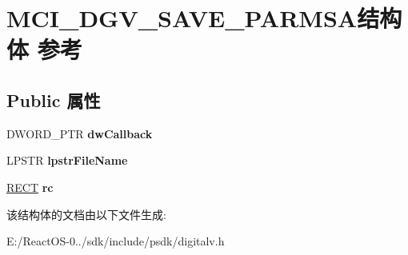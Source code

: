 \hypertarget{struct_m_c_i___d_g_v___s_a_v_e___p_a_r_m_s_a}{}\section{M\+C\+I\+\_\+\+D\+G\+V\+\_\+\+S\+A\+V\+E\+\_\+\+P\+A\+R\+M\+S\+A结构体 参考}
\label{struct_m_c_i___d_g_v___s_a_v_e___p_a_r_m_s_a}
\subsection*{Public 属性}
\begin{DoxyCompactItemize}
\item 
\mbox{\label{struct_m_c_i___d_g_v___s_a_v_e___p_a_r_m_s_a_a1239c6dc4ddb2b92169b8491aa6e3316}} 
D\+W\+O\+R\+D\+\_\+\+P\+TR {\bfseries dw\+Callback}
\item 
\mbox{\label{struct_m_c_i___d_g_v___s_a_v_e___p_a_r_m_s_a_aee8888ee60bd98b6b20227a8d70f121c}} 
L\+P\+S\+TR {\bfseries lpstr\+File\+Name}
\item 
\mbox{\label{struct_m_c_i___d_g_v___s_a_v_e___p_a_r_m_s_a_af09d3f6a29f52b8968e49808c72f934b}} 
\hyperlink{structtag_r_e_c_t}{R\+E\+CT} {\bfseries rc}
\end{DoxyCompactItemize}


该结构体的文档由以下文件生成\+:\begin{DoxyCompactItemize}
\item 
E\+:/\+React\+O\+S-\/0../sdk/include/psdk/digitalv.\+h\end{DoxyCompactItemize}
